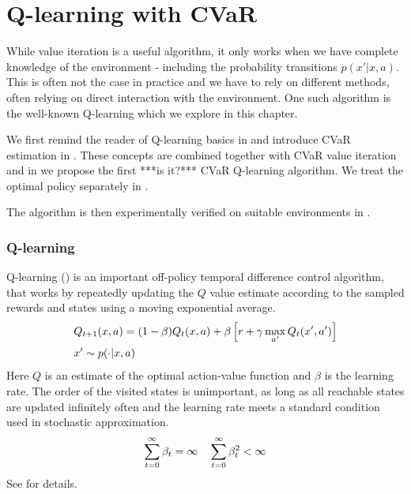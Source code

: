 \chapter{Q-learning with CVaR}\label{ch:qlearning}

While value iteration is a useful algorithm, it only works when we have complete knowledge of the environment - including the probability transitions $p(x'|x,a)$. This is often not the case in practice and we have to rely on different methods, often relying on direct interaction with the environment. One such algorithm is the well-known Q-learning which we explore in this chapter.

We first remind the reader of Q-learning basics in  and introduce CVaR estimation in . These concepts are combined together with CVaR value iteration and in  we propose the first ***is it?*** CVaR Q-learning algorithm. We treat the optimal policy separately in .

The algorithm is then experimentally verified on suitable environments in .

\subsection{Q-learning}\label{sec:qlearning}

Q-learning (\citet{watkins1992q}) is an important off-policy temporal difference control algorithm, that works by repeatedly updating the $Q$ value estimate according to the sampled rewards and states using a moving exponential average.
\begin{equation}
\begin{split}
&Q_{t+1}(x, a) = (1-\beta)Q_{t}(x, a) + \beta\left[ {r + \gamma \max_{a'} Q_t(x', a')} \right]\\
&x' \sim p(\cdot|x, a)
\end{split}
\end{equation}
Here $Q$ is an estimate of the optimal action-value function  and $\beta$ is the learning rate. The order of the visited states is unimportant, as long as all reachable states are updated infinitely often and the learning rate meets a standard condition used in stochastic approximation.
\begin{equation}\label{eqn:beta}
\sum_{t=0}^\infty \beta_t = \infty  \quad \sum_{t=0}^\infty \beta_t^2 < \infty\\
\end{equation}
See \citet{jaakkola1994convergence} for details.

